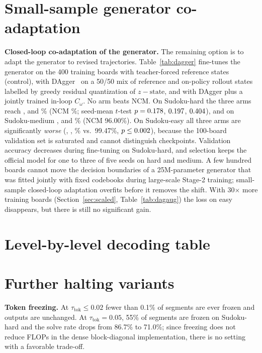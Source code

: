 

\section{Small-sample generator co-adaptation}
\label{app:dag_small}
\textbf{Closed-loop co-adaptation of the generator.} The remaining option is to adapt the generator to revised trajectories. Table~\ref{tab:dagger} fine-tunes the generator on the 400 training boards with teacher-forced reference states (control), with DAgger~\citep{ross2011dagger} on a 50/50 mix of reference and on-policy rollout states labelled by greedy residual quantization of $z-\text{state}$, and with DAgger plus a jointly trained in-loop $C_\omega$. No arm beats NCM. On Sudoku-hard the three arms reach \DgTfHard, \DgDagHard{} and \DgDagCHard\% (NCM \BaseHard\%; seed-mean $t$-test $p=0.178$, $0.197$, $0.404$), and on Sudoku-medium \DgTfMedium, \DgDagMedium{} and \DgDagCMedium\% (NCM 96.00\%). On Sudoku-easy all three arms are significantly \emph{worse} (\DgTfEasy, \DgDagEasy, \DgDagCEasy\% vs.\ 99.47\%, $p\le0.002$), because the 100-board validation set is saturated and cannot distinguish checkpoints. Validation accuracy decreases during fine-tuning on Sudoku-hard, and selection keeps the official model for one to three of five seeds on hard and medium. A few hundred boards cannot move the decision boundaries of a 25M-parameter generator that was fitted jointly with fixed codebooks during large-scale Stage-2 training; small-sample closed-loop adaptation overfits before it removes the shift. With 30$\times$ more training boards (Section~\ref{sec:scaled}, Table~\ref{tab:dagaug}) the loss on easy disappears, but there is still no significant gain.



\section{Level-by-level decoding table}
\label{app:levels}


\section{Further halting variants}
\label{app:halt_extra}
\textbf{Token freezing.} At $\tau_{\mathrm{tok}}\le0.02$ fewer than 0.1\% of segments are ever frozen and outputs are unchanged. At $\tau_{\mathrm{tok}}=0.05$, 55\% of segments are frozen on Sudoku-hard and the solve rate drops from 86.7\% to 71.0\%; since freezing does not reduce FLOPs in the dense block-diagonal implementation, there is no setting with a favorable trade-off.

